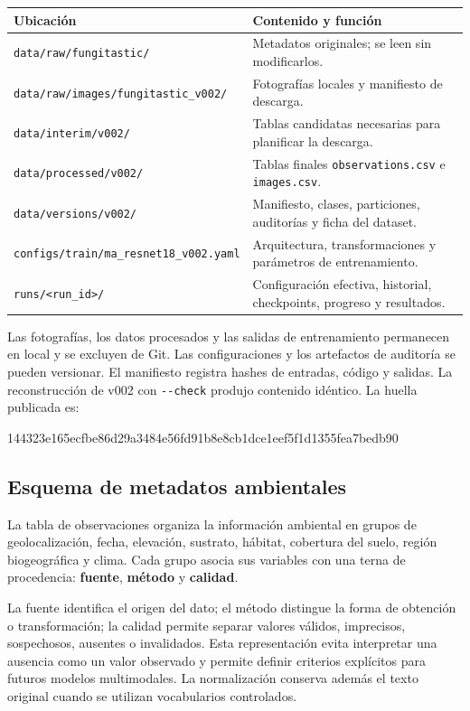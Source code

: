 \documentclass[11pt,a4paper]{article}
\newcommand{\archivo}[1]{\nolinkurl{#1}}
\begin{document}
\begin{center}
\small
\begin{tabularx}{\textwidth}{p{5.7cm}Y}
\toprule
\textbf{Ubicación} & \textbf{Contenido y función}\\
\midrule
\archivo{data/raw/fungitastic/} & Metadatos originales; se leen sin modificarlos.\\
\archivo{data/raw/images/fungitastic_v002/} & Fotografías locales y manifiesto de descarga.\\
\archivo{data/interim/v002/} & Tablas candidatas necesarias para planificar la descarga.\\
\archivo{data/processed/v002/} & Tablas finales \archivo{observations.csv} e \archivo{images.csv}.\\
\archivo{data/versions/v002/} & Manifiesto, clases, particiones, auditorías y ficha del dataset.\\
\archivo{configs/train/ma_resnet18_v002.yaml} & Arquitectura, transformaciones y parámetros de entrenamiento.\\
\archivo{runs/<run_id>/} & Configuración efectiva, historial, checkpoints, progreso y resultados.\\
\bottomrule
\end{tabularx}
\end{center}

Las fotografías, los datos procesados y las salidas de entrenamiento permanecen en
local y se excluyen de Git. Las configuraciones y los artefactos de auditoría se
pueden versionar. El manifiesto registra hashes de entradas, código y salidas.
La reconstrucción de v002 con \archivo{--check} produjo contenido idéntico.
La huella publicada es:
\begin{center}\small\ttfamily
144323e165ecfbe86d29a3484e56fd91b8e8cb1dce1eef5f1d1355fea7bedb90
\end{center}

\subsection{Esquema de metadatos ambientales}

La tabla de observaciones organiza la información ambiental en grupos de
geolocalización, fecha, elevación, sustrato, hábitat, cobertura del suelo, región
biogeográfica y clima. Cada grupo asocia sus variables con una terna de
procedencia: \textbf{fuente}, \textbf{método} y \textbf{calidad}.

La fuente identifica el origen del dato; el método distingue la forma de
obtención o transformación; la calidad permite separar valores válidos,
imprecisos, sospechosos, ausentes o invalidados. Esta representación evita
interpretar una ausencia como un valor observado y permite definir criterios
explícitos para futuros modelos multimodales. La normalización conserva además
el texto original cuando se utilizan vocabularios controlados.
\end{document}
